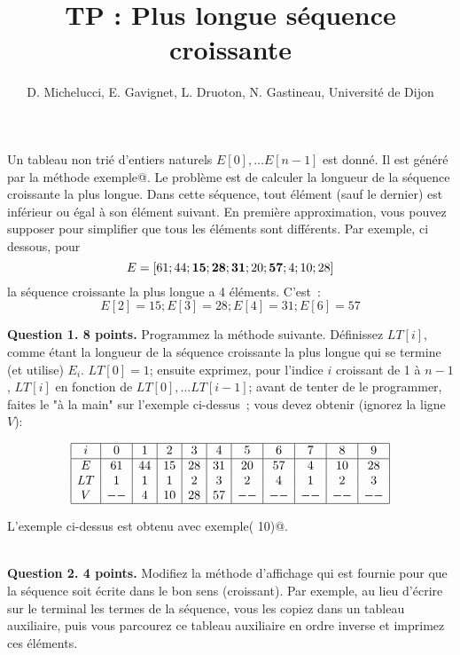 \documentclass[a4paper]{article}
\begin{document}
\date{}
\title{TP : Plus longue s\'equence croissante}
\author{D. Michelucci, E. Gavignet, L. Druoton, N.  Gastineau, Universit\'e de Dijon}
\maketitle

Un tableau non tri\'e d'entiers naturels  $E[0], \ldots E[n-1]$  est donn\'e.
Il est g\'en\'er\'e par la m\'ethode \verb@ exemple@.
Le probl\`eme est de calculer la longueur de la s\'equence croissante la plus longue.
Dans cette s\'equence, tout \'el\'ement (sauf le dernier) 
est inf\'erieur ou \'egal \`a  son \'el\'ement suivant.
En premi\`ere approximation, vous pouvez supposer pour simplifier que tous les \'el\'ements sont diff\'erents.
Par exemple, ci dessous, pour $$E=[61 ;   44 ;      {\bf 15} ;     {\bf  28} ;      {\bf 31} ;      20 ;      {\bf 57} ;      4 ;       10 ;      28]$$
la  s\'equence croissante la  plus longue a 4 \'el\'ements.
C'est~:
$$ E[2]=15; E[3]=28;        E[4]=31;        E[6]=57$$


{\bf Question 1. 8 points.} Programmez la m\'ethode suivante.  D\'efinissez  $LT[i]$, comme \'etant la longueur 
de la s\'equence croissante la plus longue qui se termine (et utilise) $E_i$.  
$LT[0]=1$; ensuite  exprimez, pour l'indice $i$ croissant de 1 \`a $n-1$,  $LT[i]$ en fonction de $LT[0], \ldots LT[i-1]$;
avant de tenter de le programmer, faites le  "\`a la main" sur l'exemple ci-dessus~;
vous devez obtenir (ignorez la ligne $V$):

$$
\begin{array}{|c|c|c|c|c|c|c|c|c|c|c|}
\hline
i &  0 &  1 &  2 &  3 &  4 &  5 &  6 &  7 &  8 &  9 \\
\hline
E & 61 &   44 &      15 &      28 &      31 &      20 &      57 &      4 &       10 &      28 \\
LT&1 &    1 &       1 &       2 &       3 &       2 &       4 &       1 &       2 &       3 \\
V & -- & 4 &       10 &      28 &      57 &      -- &    -- &    -- &    -- &    -- \\
\hline
\end{array}
$$

L'exemple ci-dessus est obtenu avec \verb@ exemple( 10)@.


~ \\
{\bf Question 2. 4 points.} Modifiez la m\'ethode d'affichage qui est fournie  pour que la s\'equence soit \'ecrite dans le bon sens
(croissant).  Par exemple, au lieu d'\'ecrire sur le terminal les termes de la s\'equence, vous les copiez dans un tableau auxiliaire, puis
vous parcourez ce tableau auxiliaire en ordre inverse et imprimez ces \'el\'ements.
\end{document}
